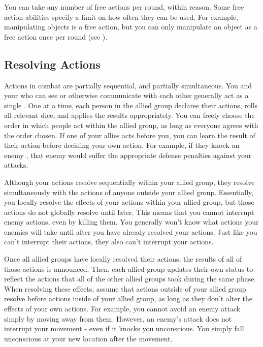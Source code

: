       You can take any number of free actions per round, within reason.
      Some free action abilities specify a limit on how often they can be used.
      For example, manipulating objects is a free action, but you can only manipulate an object as a free action once per round (see ).

  \subsection{Resolving Actions}\label{Resolving Actions}

    Actions in combat are partially sequential, and partially simultaneous.
    You and your  who can see or otherwise communicate with each other generally act as a single .
    One at a time, each person in the allied group declares their actions, rolls all relevant dice, and applies the results appropriately.
    You can freely choose the order in which people act within the allied group, as long as everyone agrees with the order chosen.
    If one of your allies acts before you, you can learn the result of their action before deciding your own action.
    For example, if they knock an enemy \prone, that enemy would suffer the appropriate defense penalties against your attacks.

    Although your actions resolve sequentially within your allied group, they resolve simultaneously with the actions of anyone outside your allied group.
    Essentially, you locally resolve the effects of your actions within your allied group, but those actions do not globally resolve until later.
    This means that you cannot interrupt enemy actions, even by killing them.
    You generally won't know what actions your enemies will take until after you have already resolved your actions.
    Just like you can't interrupt their actions, they also can't interrupt your actions.

    Once all allied groups have locally resolved their actions, the results of all of those actions is announced.
    Then, each allied group updates their own status to reflect the actions that all of the other allied groups took during the same phase.
    When resolving these effects, assume that actions outside of your allied group resolve before actions inside of your allied group, as long as they don't alter the effects of your own actions.
    For example, you cannot avoid an enemy attack simply by moving away from them.
    However, an enemy's attack does not interrupt your movement - even if it knocks you unconscious.
    You simply fall unconscious at your new location after the movement.

